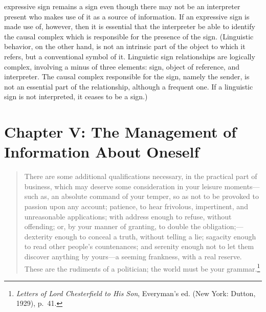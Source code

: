 \documentclass[twoside,symmetric,nobib,justified]{tufte-book}
\let\oldchapter\chapter
\def\chapter{%
  \setcounter{footnote}{0}%
  \oldchapter
}
\begin{document}
\begin{enumerate}
  expressive sign remains a sign even though there may not be an
  interpreter present who makes use of it as a source of information. If
  an expressive sign is made use of, however, then it is essential that
  the interpreter be able to identify the causal complex which is
  responsible for the presence of the sign. (Linguistic behavior, on the
  other hand, is not an intrinsic part of the object to which it refers,
  but a conventional symbol of it. Linguistic sign relationships are
  logically complex, involving a minus of three elements: sign, object
  of reference, and interpreter. The causal complex responsible for the
  sign, namely the sender, is not an essential part of the relationship,
  although a frequent one. If a linguistic sign is not interpreted, it
  ceases to be a sign.)
\end{enumerate}



    
\chapter[CHAPTER V: THE MANAGEMENT OF INFORMATION ABOUT ONESELF]{Chapter V: The Management of\\Information About Oneself}
\label{ch:Chapter V: The Management of Information About Oneself}



\begin{quote}
There are some additional qualifications necessary, in the practical
part of business, which may deserve some con­sideration in your leisure
moments---such as, an absolute command of your temper, so as not to be
provoked to passion upon any account; patience, to hear frivolous,
impertinent, and unreasonable applications; with address enough to
re­fuse, without offending; or, by your manner of granting, to double the
obligation;---dexterity enough to conceal a truth, without telling a
lie; sagacity enough to read other people's countenances; and serenity
enough not to let them discover anything by yours---a seeming frankness,
with a real reserve. These are the rudiments of a politician; the world
must be your grammar.\footnote{\emph{Letters of Lord Chesterfield to His
  Son}, Everyman's ed. (New York: Dutton, 1929), p.~41.}
\end{quote}
\end{document}
